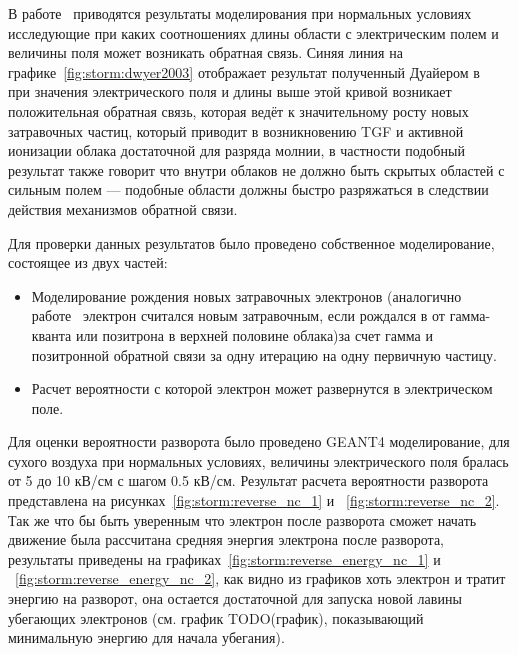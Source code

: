 В работе~\cite{dwyer2003fundamental} приводятся результаты моделирования при нормальных условиях исследующие при каких соотношениях длины области с электрическим полем и величины поля может возникать обратная связь. Синяя линия на графике~\ref{fig:storm:dwyer2003} отображает результат полученный Дуайером в ~\cite{dwyer2003fundamental} при значения электрического поля и длины выше этой кривой возникает положительная обратная связь, которая ведёт к значительному росту новых затравочных частиц, который приводит в возникновению TGF и активной ионизации облака достаточной для разряда молнии, в частности подобный результат также говорит что внутри облаков не должно быть скрытых областей с сильным полем --- подобные области должны быстро разряжаться в следствии действия механизмов обратной связи.

Для проверки данных результатов было проведено собственное моделирование, состоящее из двух частей:
\begin{itemize}
	\item Моделирование рождения новых затравочных электронов (аналогично работе~\cite{dwyer2003fundamental} электрон считался новым затравочным, если рождался в от гамма-кванта или позитрона в верхней половине облака)за счет гамма и позитронной обратной связи за одну итерацию на одну первичную частицу.
	\item Расчет вероятности с которой электрон может развернутся в электрическом поле. 
\end{itemize}
Для оценки вероятности разворота было проведено GEANT4 моделирование, для сухого воздуха при нормальных условиях, величины электрического поля бралась от 5 до 10 кВ/см с шагом 0.5 кВ/см. Результат расчета вероятности разворота представлена на рисунках~\ref{fig:storm:reverse_nc_1} и ~\ref{fig:storm:reverse_nc_2}. Так же что бы быть уверенным что электрон после разворота сможет начать движение была рассчитана средняя энергия электрона после разворота, результаты приведены на графиках~\ref{fig:storm:reverse_energy_nc_1} и ~\ref{fig:storm:reverse_energy_nc_2}, как видно из графиков хоть электрон и тратит энергию на разворот, она остается достаточной для запуска новой лавины убегающих электронов (см. график TODO(график), показывающий минимальную энергию для начала убегания).  

